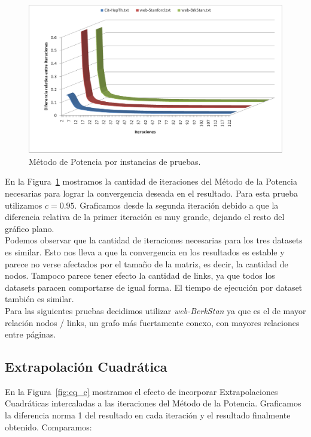 \begin{figure}[!htbp]
  \begin{center}
    \includegraphics[scale=0.35]{img/datasets.png}
    \caption{\label{fig:datasets} Método de Potencia por instancias de pruebas.}
  \end{center}
\end{figure}

En la Figura~\ref{fig:datasets} mostramos la cantidad de iteraciones del Método
de la Potencia necesarias para lograr la convergencia deseada en el resultado.
Para esta prueba utilizamos $c=0.95$. Graficamos desde la segunda iteración
debido a que la diferencia relativa de la primer iteración es muy grande,
dejando el resto del gráfico plano.\\

Podemos observar que la cantidad de iteraciones necesarias para los tres
datasets es similar. Esto nos lleva a que la convergencia en los resultados es
estable y parece no verse afectados por el tamaño de la matriz, es decir, la
cantidad de nodos. Tampoco parece tener efecto la cantidad de links, ya que
todos los datasets paracen comportarse de igual forma. El tiempo de ejecución
por dataset también es similar.\\

Para las siguientes pruebas decidimos utilizar \emph{web-BerkStan} ya que es el
de mayor relación nodos / links, un grafo más fuertamente conexo, con mayores
relaciones entre páginas.

\subsection{Extrapolación Cuadrática}

En la Figura~\ref{fig:eq_c} mostramos el efecto de incorporar Extrapolaciones
Cuadráticas intercaladas a las iteraciones del Método de la Potencia.
Graficamos la diferencia norma 1 del resultado en cada iteración y el resultado
finalmente obtenido. Comparamos:


